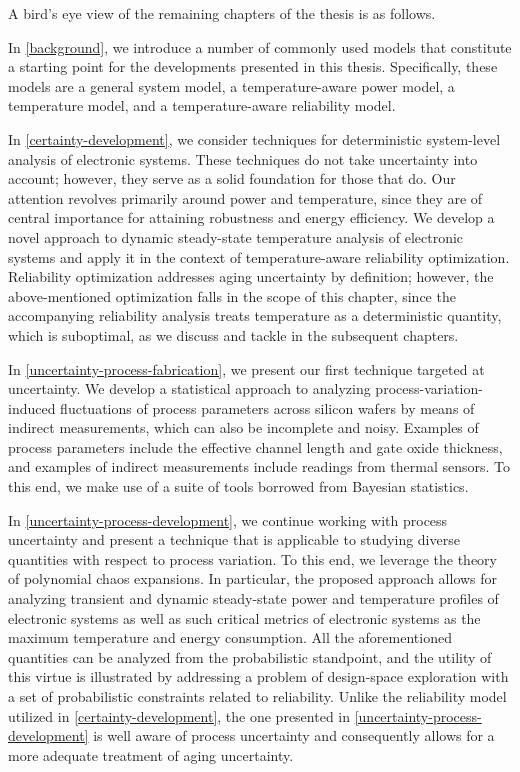 A bird's eye view of the remaining chapters of the thesis is as follows.

In \cref{background}, we introduce a number of commonly used models that
constitute a starting point for the developments presented in this thesis.
Specifically, these models are a general system model, a temperature-aware power
model, a temperature model, and a temperature-aware reliability model.

In \cref{certainty-development}, we consider techniques for deterministic
system-level analysis of electronic systems. These techniques do not take
uncertainty into account; however, they serve as a solid foundation for those
that do. Our attention revolves primarily around power and temperature, since
they are of central importance for attaining robustness and energy efficiency.
We develop a novel approach to dynamic steady-state temperature analysis of
electronic systems and apply it in the context of temperature-aware reliability
optimization. Reliability optimization addresses aging uncertainty by
definition; however, the above-mentioned optimization falls in the scope of this
chapter, since the accompanying reliability analysis treats temperature as a
deterministic quantity, which is suboptimal, as we discuss and tackle in the
subsequent chapters.

In \cref{uncertainty-process-fabrication}, we present our first technique
targeted at uncertainty. We develop a statistical approach to analyzing
process-variation-induced fluctuations of process parameters across silicon
wafers by means of indirect measurements, which can also be incomplete and
noisy. Examples of process parameters include the effective channel length and
gate oxide thickness, and examples of indirect measurements include readings
from thermal sensors. To this end, we make use of a suite of tools borrowed from
Bayesian statistics.

In \cref{uncertainty-process-development}, we continue working with process
uncertainty and present a technique that is applicable to studying diverse
quantities with respect to process variation. To this end, we leverage the
theory of polynomial chaos expansions. In particular, the proposed approach
allows for analyzing transient and dynamic steady-state power and temperature
profiles of electronic systems as well as such critical metrics of electronic
systems as the maximum temperature and energy consumption. All the
aforementioned quantities can be analyzed from the probabilistic standpoint, and
the utility of this virtue is illustrated by addressing a problem of
design-space exploration with a set of probabilistic constraints related to
reliability. Unlike the reliability model utilized in
\cref{certainty-development}, the one presented in
\cref{uncertainty-process-development} is well aware of process uncertainty and
consequently allows for a more adequate treatment of aging uncertainty.

